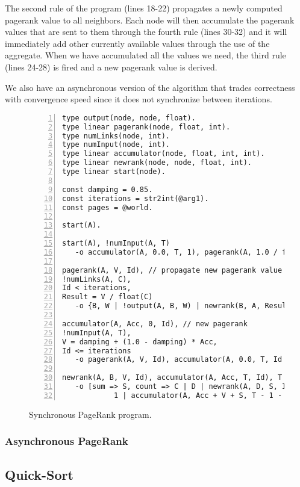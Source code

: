 The second rule of the program (lines 18-22) propagates a newly computed pagerank value to all neighbors. Each node will then accumulate
the pagerank values that are sent to them through the fourth rule (lines 30-32) and it will immediately add other currently available values
through the use of the aggregate. When we have accumulated all the values we need, the third rule (lines 24-28) is fired and a new pagerank value is derived.

We also have an asynchronous version of the algorithm that trades correctness with convergence speed since it does not synchronize between iterations.

\begin{figure}[h!]
   \footnotesize\begin{Verbatim}[numbers=left]
type output(node, node, float).
type linear pagerank(node, float, int).
type numLinks(node, int).
type numInput(node, int).
type linear accumulator(node, float, int, int).
type linear newrank(node, node, float, int).
type linear start(node).

const damping = 0.85.
const iterations = str2int(@arg1).
const pages = @world.

start(A).

start(A), !numInput(A, T)
   -o accumulator(A, 0.0, T, 1), pagerank(A, 1.0 / float(pages), 0).

pagerank(A, V, Id), // propagate new pagerank value
!numLinks(A, C),
Id < iterations,
Result = V / float(C)
   -o {B, W | !output(A, B, W) | newrank(B, A, Result, Id + 1)}.

accumulator(A, Acc, 0, Id), // new pagerank
!numInput(A, T),
V = damping + (1.0 - damping) * Acc,
Id <= iterations
   -o pagerank(A, V, Id), accumulator(A, 0.0, T, Id + 1).
	
newrank(A, B, V, Id), accumulator(A, Acc, T, Id), T > 0
   -o [sum => S, count => C | D | newrank(A, D, S, Id) |
            1 | accumulator(A, Acc + V + S, T - 1 - C, Id)].
\end{Verbatim}
\caption{Synchronous PageRank program.}
\label{code:pagerank}
\normalsize
\end{figure}

\subsubsection{Asynchronous PageRank}

\subsection{Quick-Sort}

